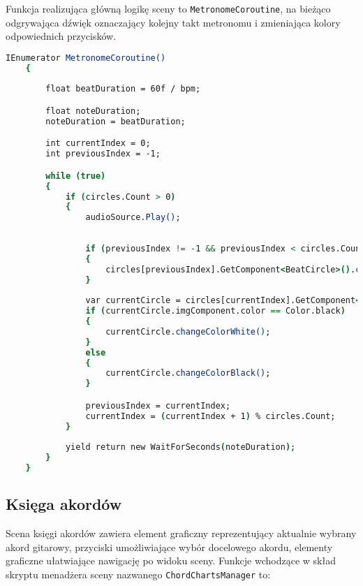 Funkcja realizująca główną logikę sceny to \texttt{MetronomeCoroutine}, na bieżąco odgrywająca dźwięk oznaczający kolejny takt metronomu i zmieniająca kolory odpowiednich przycisków.

\begin{lstlisting}[language=csh,caption=Wątek \texttt{MetronomeCoroutine}, label=lst:2]
    IEnumerator MetronomeCoroutine()
    {
        
        float beatDuration = 60f / bpm;

        float noteDuration;
        noteDuration = beatDuration;

        int currentIndex = 0;
        int previousIndex = -1;

        while (true)
        {
            if (circles.Count > 0)
            {
                audioSource.Play();
                
           
                if (previousIndex != -1 && previousIndex < circles.Count)
                {
                    circles[previousIndex].GetComponent<BeatCircle>().changeColorWhite();
                }
                
                var currentCircle = circles[currentIndex].GetComponent<BeatCircle>();
                if (currentCircle.imgComponent.color == Color.black)
                {
                    currentCircle.changeColorWhite();
                }
                else
                {
                    currentCircle.changeColorBlack();
                }

                previousIndex = currentIndex;
                currentIndex = (currentIndex + 1) % circles.Count;
            }
            
            yield return new WaitForSeconds(noteDuration);
        }
    }
\end{lstlisting}

\subsection{Księga akordów}

Scena księgi akordów zawiera element graficzny reprezentujący aktualnie wybrany akord gitarowy, przyciski umożliwiające wybór docelowego akordu, elementy graficzne ułatwiające nawigację po widoku sceny. Funkcje wchodzące w skład skryptu menadżera sceny nazwanego \texttt{ChordChartsManager} to:

